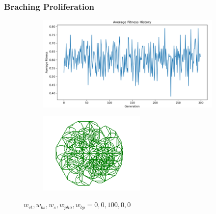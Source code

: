 \subsubsection{Braching Proliferation}
\begin{figure}[H]
    \centering
    \begin{subfigure}[b]{0.3\textwidth}
        \includegraphics[width=\textwidth]{bp_only.png}
    \end{subfigure}
    \begin{subfigure}[b]{0.1\textwidth}
        \includegraphics[width=\textwidth]{bp_only_dr.png}
    \end{subfigure}

    \vspace{0.5cm}
    \caption{$w_{vt}, w_{bs}, w_{s}, w_{pha}, w_{bp} = 0, 0, 100, 0, 0$}
    \label{fig:subfigures}
\end{figure}



